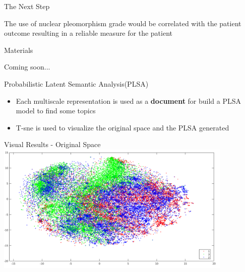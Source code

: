 \documentclass[usenames,dvipsnames]{beamer}
\begin{document}
\begin{frame}{The Next Step}
\begin{block}{}
The use of nuclear pleomorphism grade would be correlated with the patient outcome resulting in a reliable measure for the patient
\end{block}
\end{frame}

\begin{frame}{Materials}

Coming soon...

\end{frame}



\begin{frame}{Probabilistic Latent Semantic Analysis(PLSA)}
\begin{itemize}
\item Each multiscale representation is used as a \textbf{document} for build a PLSA model to find some topics
\pause
\item T-sne is used to visualize the original space and the PLSA generated
\end{itemize}
\end{frame}

\begin{frame}{Visual Results - Original Space}
\centering
\includegraphics[width=0.85\textwidth]{imagenes/all.png}
\end{frame}
\end{document}
